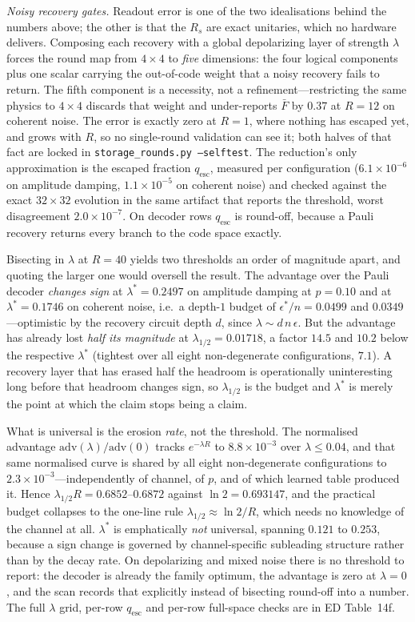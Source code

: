 \documentclass[aps,prxquantum,reprint,superscriptaddress]{revtex4-2}
\begin{document}
\emph{Noisy recovery gates.} Readout error is one of the two idealisations behind
the numbers above; the other is that the $R_s$ are exact unitaries, which no
hardware delivers. Composing each recovery with a global depolarizing layer of
strength $\lambda$ forces the round map from $4\times4$ to \emph{five} dimensions:
the four logical components plus one scalar carrying the out-of-code weight that a
noisy recovery fails to return. The fifth component is a necessity, not a
refinement---restricting the same physics to $4\times4$ discards that weight and
under-reports $\bar F$ by $0.37$ at $R=12$ on coherent noise. The error is exactly
zero at $R=1$, where nothing has escaped yet, and grows with $R$, so no
single-round validation can see it; both halves of that fact are locked in
\texttt{storage\_rounds.py --selftest}. The reduction's only approximation is the
escaped fraction $q_\mathrm{esc}$, measured per configuration
($6.1\times10^{-6}$ on amplitude damping, $1.1\times10^{-5}$ on coherent noise) and
checked against the exact $32\times32$ evolution in the same artifact that reports
the threshold, worst disagreement $2.0\times10^{-7}$. On decoder rows
$q_\mathrm{esc}$ is round-off, because a Pauli recovery returns every branch to the
code space exactly.

Bisecting in $\lambda$ at $R=40$ yields two thresholds an order of magnitude apart,
and quoting the larger one would oversell the result. The advantage over the Pauli
decoder \emph{changes sign} at $\lambda^*=0.2497$ on amplitude damping at $p=0.10$
and at $\lambda^*=0.1746$ on coherent noise, i.e.\ a depth-$1$ budget of
$\epsilon^*/n=0.0499$ and $0.0349$---optimistic by the recovery circuit depth $d$,
since $\lambda\sim d\,n\,\epsilon$. But the advantage has already lost \emph{half
its magnitude} at $\lambda_{1/2}=0.01718$, a factor $14.5$ and $10.2$ below the
respective $\lambda^*$ (tightest over all eight non-degenerate configurations,
$7.1$). A recovery layer that has erased half the headroom is operationally
uninteresting long before that headroom changes sign, so $\lambda_{1/2}$ is the
budget and $\lambda^*$ is merely the point at which the claim stops being a claim.

What is universal is the erosion \emph{rate}, not the threshold. The normalised
advantage $\mathrm{adv}(\lambda)/\mathrm{adv}(0)$ tracks $e^{-\lambda R}$ to
$8.8\times10^{-3}$ over $\lambda\le0.04$, and that same normalised curve is shared
by all eight non-degenerate configurations to $2.3\times10^{-3}$---independently of
channel, of $p$, and of which learned table produced it. Hence
$\lambda_{1/2}R=0.6852$--$0.6872$ against $\ln2=0.693147$, and the practical budget
collapses to the one-line rule $\lambda_{1/2}\approx\ln2/R$, which needs no
knowledge of the channel at all. $\lambda^*$ is emphatically \emph{not} universal,
spanning $0.121$ to $0.253$, because a sign change is governed by channel-specific
subleading structure rather than by the decay rate. On depolarizing and mixed noise
there is no threshold to report: the decoder is already the family optimum, the
advantage is zero at $\lambda=0$, and the scan records that explicitly instead of
bisecting round-off into a number. The full $\lambda$ grid, per-row $q_\mathrm{esc}$
and per-row full-space checks are in ED Table~14f.
\end{document}
